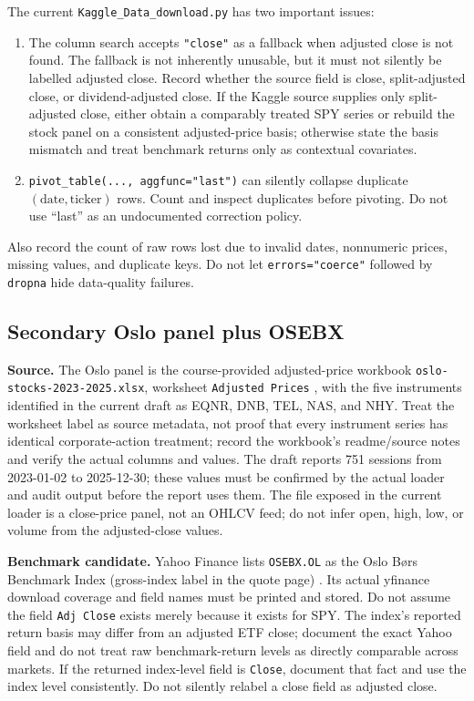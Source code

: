 \documentclass[11pt,a4paper]{article}
\begin{document}
The current \texttt{Kaggle\_Data\_download.py} has two important issues:
\begin{enumerate}
  \item The column search accepts \texttt{"close"} as a fallback when adjusted close is not found. The fallback is not inherently unusable, but it must not silently be labelled adjusted close. Record whether the source field is close, split-adjusted close, or dividend-adjusted close. If the Kaggle source supplies only split-adjusted close, either obtain a comparably treated SPY series or rebuild the stock panel on a consistent adjusted-price basis; otherwise state the basis mismatch and treat benchmark returns only as contextual covariates.
  \item \texttt{pivot\_table(..., aggfunc="last")} can silently collapse duplicate $(\text{date},\text{ticker})$ rows. Count and inspect duplicates before pivoting. Do not use ``last'' as an undocumented correction policy.
\end{enumerate}

Also record the count of raw rows lost due to invalid dates, nonnumeric prices, missing values, and duplicate keys. Do not let \texttt{errors="coerce"} followed by \texttt{dropna} hide data-quality failures.

\subsection{Secondary Oslo panel plus OSEBX}
\label{sec:oslodata}

\textbf{Source.} The Oslo panel is the course-provided adjusted-price workbook \texttt{oslo-stocks-2023-}\allowbreak\texttt{2025.xlsx}, worksheet \texttt{Adjusted Prices} \cite{OsloWorkbook}, with the five instruments identified in the current draft as EQNR, DNB, TEL, NAS, and NHY. Treat the worksheet label as source metadata, not proof that every instrument series has identical corporate-action treatment; record the workbook's readme/source notes and verify the actual columns and values. The draft reports 751 sessions from 2023-01-02 to 2025-12-30; these values must be confirmed by the actual loader and audit output before the report uses them. The file exposed in the current loader is a close-price panel, not an OHLCV feed; do not infer open, high, low, or volume from the adjusted-close values.

\textbf{Benchmark candidate.} Yahoo Finance lists \texttt{OSEBX.OL} as the Oslo B\o rs Benchmark Index (gross-index label in the quote page) \cite{OSEBXYahoo}. Its actual yfinance download coverage and field names must be printed and stored. Do not assume the field \texttt{Adj Close} exists merely because it exists for SPY. The index's reported return basis may differ from an adjusted ETF close; document the exact Yahoo field and do not treat raw benchmark-return levels as directly comparable across markets. If the returned index-level field is \texttt{Close}, document that fact and use the index level consistently. Do not silently relabel a close field as adjusted close.
\end{document}
